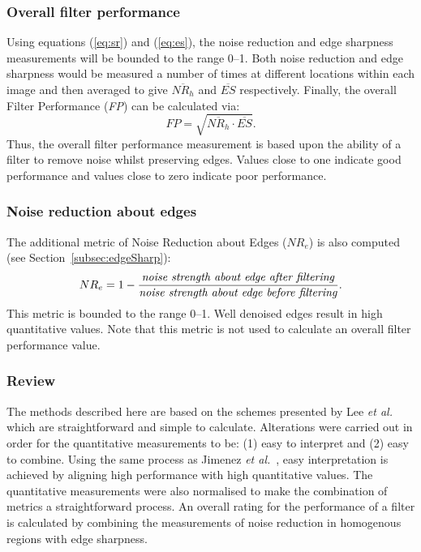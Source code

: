 \documentclass[12pt]{report}
\begin{document}
\subsubsection{Overall filter performance}
Using equations (\ref{eq:sr}) and (\ref{eq:es}), the noise reduction and edge sharpness measurements
will be bounded to the range 0--1. Both noise reduction and edge sharpness would be measured 
a number of times at different locations within each image and then averaged to give
$\overline{NR_{h}}$ and $\overline{ES}$ respectively. 
Finally, the overall Filter Performance (\emph{FP}) can be calculated via:
\begin{equation}
	FP = \sqrt{\overline{NR_{h}} \cdot \overline{ES}}.
\end{equation}
Thus, the overall filter performance measurement is based upon the ability of a filter
to remove noise whilst preserving edges. Values close to one indicate good performance
and values close to zero indicate poor performance.

\subsubsection{Noise reduction about edges}
The additional metric of Noise Reduction about Edges ($NR_{e}$) is also
computed (see Section~\ref{subsec:edgeSharp}):
\begin{equation}
	\label{eq:nredge}
NR_{e} = 1 - \frac{\mbox{\emph{noise strength about edge after filtering}}}
                  {\mbox{\emph{noise strength about edge before filtering}}}.
\end{equation}
This metric is bounded to the range 0--1. Well denoised edges 
result in high quantitative values. Note that this metric is not used 
to calculate an overall filter performance value.

\subsubsection{Review}
The methods described here are based on the schemes presented by Lee
\emph{et al.}~\cite{lee94}  which are straightforward and simple to calculate. 
Alterations were carried out in order for the quantitative measurements to be:
(1) easy to interpret and (2) easy to combine.
Using the same process as Jimenez \emph{et al.}~\cite{jim2001}, 
easy interpretation is achieved by aligning 
high performance with high quantitative values. 
The quantitative measurements were also normalised to 
make the combination of metrics a straightforward process.
An overall rating for the performance of a filter is calculated by combining 
the measurements of noise reduction in homogenous regions with edge
sharpness.  
\end{document}
